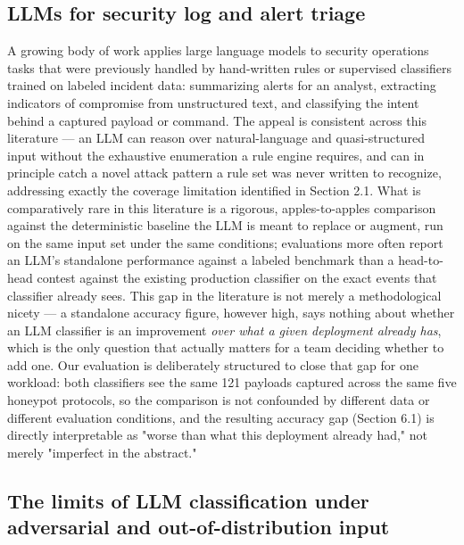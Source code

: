 \documentclass[journal,10pt,twocolumn]{IEEEtran}
\begin{document}
\subsection{LLMs for security log and alert triage}

A growing body of work applies large language models to security operations tasks that were previously handled by hand-written rules or supervised classifiers trained on labeled incident data: summarizing alerts for an analyst, extracting indicators of compromise from unstructured text, and classifying the intent behind a captured payload or command. The appeal is consistent across this literature --- an LLM can reason over natural-language and quasi-structured input without the exhaustive enumeration a rule engine requires, and can in principle catch a novel attack pattern a rule set was never written to recognize, addressing exactly the coverage limitation identified in Section 2.1. What is comparatively rare in this literature is a rigorous, apples-to-apples comparison against the deterministic baseline the LLM is meant to replace or augment, run on the same input set under the same conditions; evaluations more often report an LLM's standalone performance against a labeled benchmark than a head-to-head contest against the existing production classifier on the exact events that classifier already sees. This gap in the literature is not merely a methodological nicety --- a standalone accuracy figure, however high, says nothing about whether an LLM classifier is an improvement \emph{over what a given deployment already has}, which is the only question that actually matters for a team deciding whether to add one. Our evaluation is deliberately structured to close that gap for one workload: both classifiers see the same 121 payloads captured across the same five honeypot protocols, so the comparison is not confounded by different data or different evaluation conditions, and the resulting accuracy gap (Section 6.1) is directly interpretable as "worse than what this deployment already had," not merely "imperfect in the abstract."

\subsection{The limits of LLM classification under adversarial and out-of-distribution input}
\end{document}
